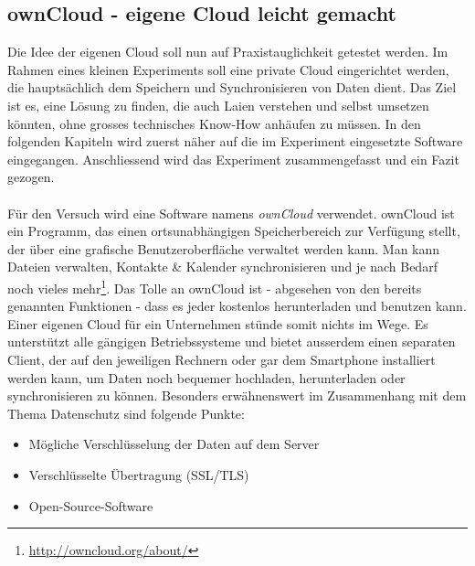 \subsection{ownCloud - eigene Cloud leicht gemacht}
Die Idee der eigenen Cloud soll nun auf Praxistauglichkeit getestet werden. Im Rahmen eines kleinen Experiments soll eine private Cloud eingerichtet werden, die hauptsächlich dem Speichern und Synchronisieren von Daten dient. Das Ziel ist es, eine Lösung zu finden, die auch Laien verstehen und selbst umsetzen könnten, ohne grosses technisches Know-How anhäufen zu müssen. In den folgenden Kapiteln wird zuerst näher auf die im Experiment eingesetzte Software eingegangen. Anschliessend wird das Experiment zusammengefasst und ein Fazit gezogen.
\\
\\
Für den Versuch wird eine Software namens \textit{ownCloud} verwendet. ownCloud ist ein Programm, das einen ortsunabhängigen Speicherbereich zur Verfügung stellt, der über eine grafische Benutzeroberfläche verwaltet werden kann. Man kann Dateien verwalten, Kontakte \& Kalender synchronisieren und je nach Bedarf noch vieles mehr\footnote{\url{http://owncloud.org/about/}}.
Das Tolle an ownCloud ist - abgesehen von den bereits genannten Funktionen - dass es jeder kostenlos herunterladen und benutzen kann. Einer eigenen Cloud für ein Unternehmen stünde somit nichts im Wege. Es unterstützt alle gängigen Betriebssysteme und bietet ausserdem einen separaten Client, der auf den jeweiligen Rechnern oder gar dem Smartphone installiert werden kann, um Daten noch bequemer hochladen, herunterladen oder synchronisieren zu können.
Besonders erwähnenswert im Zusammenhang mit dem Thema Datenschutz sind folgende Punkte:

\begin{itemize}
\item Mögliche Verschlüsselung der Daten auf dem Server
\item Verschlüsselte Übertragung (SSL/TLS)
\item Open-Source-Software
\end{itemize}


